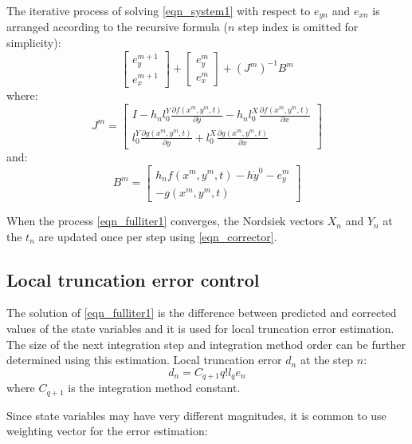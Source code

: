 \documentclass[lettersize,journal]{IEEEtran}
\begin{document}
The iterative process of solving \eqref{eqn_system1} with respect to \(e_{yn}\) and \(e_{xn}\) is arranged according to the recursive formula (\(n\) step index is omitted for simplicity):
\begin{equation}
	\label{eqn_fulliter1}
	\begin{bmatrix}
		e_{y}^{m+1} \\
		e_{x}^{m+1} 
	\end{bmatrix}
	+ 
	\begin{bmatrix}
		e_{y}^m \\
		e_{x}^m 
	\end{bmatrix}
	+ (J^{m})^{-1}B^m
\end{equation}
\noindent where:
\begin{equation}
	J^m = \begin{bmatrix}
		I - h_nl_0^Y\frac{\partial f(x^m, y^m, t)}{\partial y}  -  h_nl_0^X\frac{\partial f(x^m, y^m, t)}{\partial x} \\
		l_0^Y\frac{\partial g(x^m, y^m, t)}{\partial y} +  l_0^X\frac{\partial g(x^m, y^m, t)}{\partial x} 
	\end{bmatrix}
\end{equation}
\noindent and:
\begin{equation}
	B^m = 
	\begin{bmatrix}
		h_nf(x^m, y^m, t) - h \dot{y}^0 - e_y^m \\
		-g(x^m, y^m, t) 
	\end{bmatrix}
\end{equation}

When the process \eqref{eqn_fulliter1} converges, the Nordsiek vectors \(X_n\) and \(Y_n\) at the \(t_n\) are updated once per step using \eqref{eqn_corrector}.

\subsection{Local truncation error control}
The solution of \eqref{eqn_fulliter1} is the difference between predicted and corrected values of the state variables and it is used for local truncation error estimation. The size of the next integration step and integration method order can be further determined using this estimation. Local truncation error \(d_n\) at the step \(n\):
\begin{equation}
	d_n=C_{q+1}q!l_qe_n
\end{equation}
\noindent where \(C_{q+1}\) is the integration method constant.

Since state variables may have very different magnitudes, it is common to use weighting vector for the error estimation:
\end{document}

